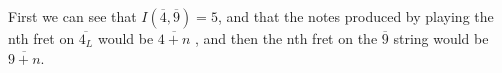 \documentclass[preview]{standalone}
\begin{document}
\begin{center}
First we can see that $I(\overline{4}, \overline{9}) = 5$, and that the notes produced by playing the nth fret on $\overline{4_L}$ would be $\overline{4 + n}$ , and then the nth fret on the $\overline{9}$ string would be $ \overline{9 + n}$.
\end{center}
\end{document}
